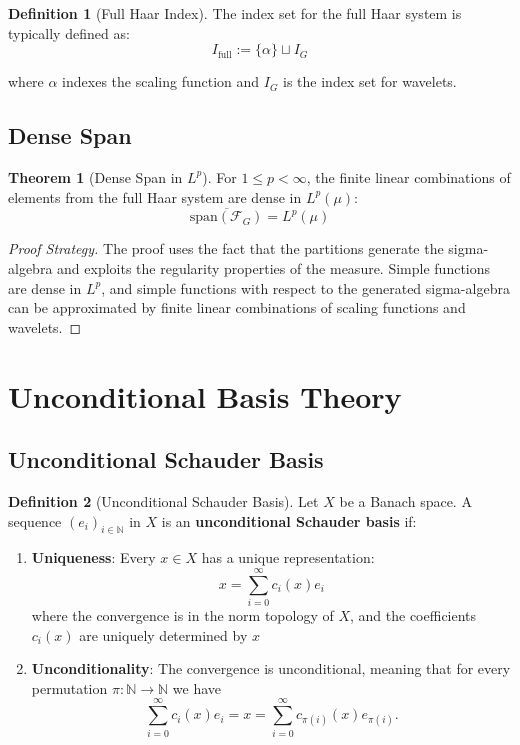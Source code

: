 \documentclass[12pt,a4paper]{article}
\theoremstyle{definition}
\newtheorem{definition}{Definition}[section]
\newtheorem{theorem}{Theorem}[section]
\newcommand{\Lp}[1]{L^{#1}}
\begin{document}
\begin{definition}[Full Haar Index]
The index set for the full Haar system is typically defined as:
$$I_{\text{full}} := \{\alpha\} \sqcup I_G$$

where $\alpha$ indexes the scaling function and $I_G$ is the index set for wavelets.
\end{definition}

 
\subsection{Dense Span}

\begin{theorem}[Dense Span in $\Lp{p}$]
For $1 \leq  p < \infty$, the finite linear combinations of elements from the full Haar system are dense in $\Lp{p}(\mu)$:
$$\overline{\text{span}(\mathcal{F}_G)} = \Lp{p}(\mu)$$
\end{theorem}

\begin{proof}[Proof Strategy]
The proof uses the fact that the partitions generate the sigma-algebra and exploits the regularity properties of the measure. Simple functions are dense in $\Lp{p}$, and simple functions with respect to the generated sigma-algebra can be approximated by finite linear combinations of scaling functions and wavelets.
\end{proof}

\newpage

\section{Unconditional Basis Theory}

\subsection{Unconditional Schauder Basis}

\begin{definition}[Unconditional Schauder Basis]
Let $X$ be a Banach space. A sequence $(e_i)_{i \in \mathbb{N}}$ in $X$ is an \textbf{unconditional Schauder basis} if:

\begin{enumerate}[label=(\roman*)]
  \item \textbf{Uniqueness}: Every $x \in X$ has a unique representation:
    $$x = \sum_{i=0}^\infty  c_i(x) e_i$$
    where the convergence is in the norm topology of $X$, and the coefficients $c_i(x)$ are uniquely determined by $x$
  
  \item \textbf{Unconditionality}: The convergence is unconditional, meaning that for every permutation $\pi\colon \mathbb{N} \rightarrow\mathbb{N}$ we have 
    $$ \sum_{i=0}^\infty  c_i(x) e_i  = x =  \sum_{i=0}^\infty  c_{\pi(i)} (x) e_{\pi(i)}.$$
\end{enumerate}
\end{definition}
\end{document}
